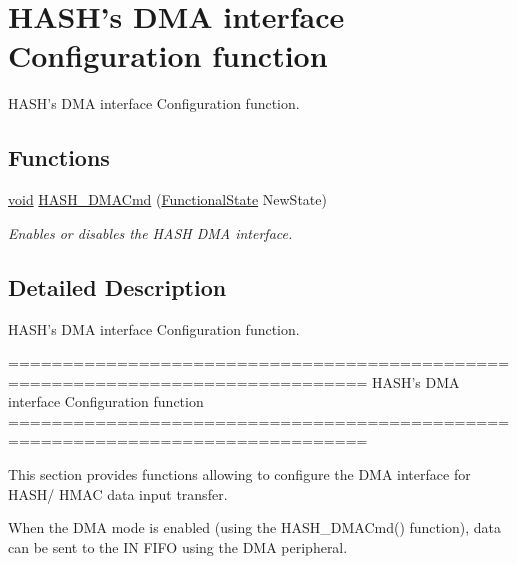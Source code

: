 \hypertarget{group___h_a_s_h___group4}{\section{H\-A\-S\-H's D\-M\-A interface Configuration function}
\label{group___h_a_s_h___group4}
}


H\-A\-S\-H's D\-M\-A interface Configuration function.  


\subsection*{Functions}
\begin{DoxyCompactItemize}
\item 
\hyperlink{group___n_a_m_e_ga18028b8badbf1ea7e704ccac3c488e82}{void} \hyperlink{group___h_a_s_h___group4_ga6bc756803b0b3a03eecc47cb570e1bd3}{H\-A\-S\-H\-\_\-\-D\-M\-A\-Cmd} (\hyperlink{group___exported__types_gac9a7e9a35d2513ec15c3b537aaa4fba1}{Functional\-State} New\-State)
\begin{DoxyCompactList}\small\item\em Enables or disables the H\-A\-S\-H D\-M\-A interface. \end{DoxyCompactList}\end{DoxyCompactItemize}


\subsection{Detailed Description}
H\-A\-S\-H's D\-M\-A interface Configuration function. \begin{DoxyVerb} ===============================================================================
                   HASH's DMA interface Configuration function
 ===============================================================================  

  This section provides functions allowing to configure the DMA interface for 
  HASH/ HMAC data input transfer.
   
  When the DMA mode is enabled (using the HASH_DMACmd() function), data can be 
  sent to the IN FIFO using the DMA peripheral.\end{DoxyVerb}
 

